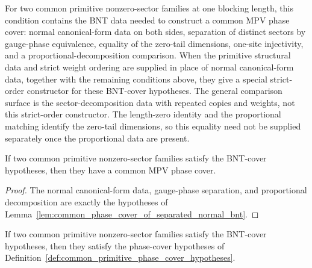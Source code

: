 \begin{definition}%
\label{def:common_primitive_bnt_cover_hypotheses}
	\leanok
	For two common primitive nonzero-sector families at one blocking length, this
	condition contains the BNT data needed to construct a common MPV phase cover:
	normal canonical-form data on both sides, separation of distinct sectors by
	gauge-phase equivalence, equality of the zero-tail dimensions, one-site
	injectivity, and a proportional-decomposition comparison. When the primitive
	structural data and strict weight ordering are supplied in place of normal
	canonical-form data, together with the remaining conditions above, they give a
	special strict-order constructor for these BNT-cover hypotheses.  The general
	comparison surface is the sector-decomposition data with repeated copies and
	weights, not this strict-order constructor.  The length-zero identity and the
	proportional matching identify the zero-tail dimensions, so this equality need
	not be supplied separately once the proportional data are present.
\end{definition}

\begin{lemma}%
\label{lem:common_primitive_bnt_cover_hypotheses_to_common_phase_cover}
	\leanok
	If two common primitive nonzero-sector families satisfy the BNT-cover
	hypotheses, then they have a common MPV phase cover.
\end{lemma}

\begin{proof}
	\leanok
	The normal canonical-form data, gauge-phase separation, and proportional
	decomposition are exactly the hypotheses of
	Lemma~\ref{lem:common_phase_cover_of_separated_normal_bnt}.
\end{proof}

\begin{lemma}%
\label{lem:common_primitive_bnt_cover_hypotheses_to_phase_cover_hypotheses}
	\leanok
	If two common primitive nonzero-sector families satisfy the BNT-cover
	hypotheses, then they satisfy the phase-cover hypotheses of
	Definition~\ref{def:common_primitive_phase_cover_hypotheses}.
\end{lemma}

